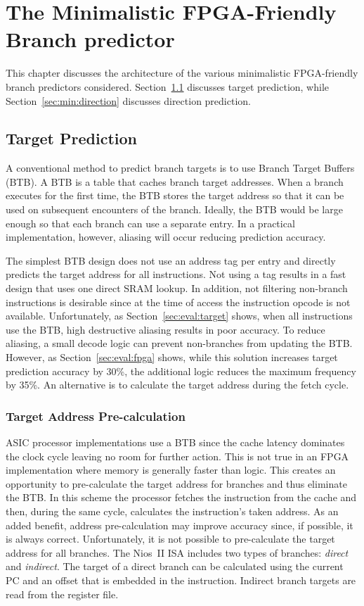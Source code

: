 \chapter{The Minimalistic FPGA-Friendly Branch predictor}
This chapter discusses the architecture of the various minimalistic FPGA-friendly branch predictors considered. Section~\ref{sec:min:target} discusses target prediction, while Section~\ref{sec:min:direction} discusses direction prediction.

\section{Target Prediction}
\label{sec:min:target}
A conventional method to predict branch targets is to use Branch Target Buffers (BTB). A BTB is a table that caches branch target addresses. When a branch executes for the first time, the BTB stores the target address so that it can be used on subsequent encounters of the branch. Ideally, the BTB would be large enough so that each branch can use a separate entry. In a practical implementation, however, aliasing will occur reducing prediction accuracy.  

The simplest BTB design does not use an address tag per entry and directly predicts the target address for all instructions. Not using a tag results in a fast design that uses one direct SRAM lookup. In addition, not filtering non-branch instructions is desirable since at the time of access the instruction opcode is not available. Unfortunately, as Section~\ref{sec:eval:target} shows, when all instructions use the BTB, high destructive aliasing results in poor accuracy. To reduce aliasing, a small decode logic can prevent non-branches from updating the BTB. However, as Section~\ref{sec:eval:fpga} shows, while this solution increases target prediction accuracy by 30\%, the additional logic reduces the maximum frequency by 35\%. An alternative is to calculate the target address during the fetch cycle.

\subsection{Target Address Pre-calculation}
\label{sec:min:target:addrprecalc}

ASIC processor implementations use a BTB since the cache latency dominates the clock cycle leaving no room for further action. This is not true in an FPGA implementation where memory is generally faster than logic. This creates an opportunity to pre-calculate the target address for branches and thus eliminate the BTB. In this scheme the processor fetches the instruction from the cache and then, during the same cycle, calculates the instruction's taken address. As an added benefit, address pre-calculation may improve accuracy since, if possible, it is always correct. Unfortunately, it is not possible to pre-calculate the target address for all branches. The Nios~II ISA includes two types of branches: \textit{direct} and \textit{indirect}. The target of a direct branch can be calculated using the current PC and an offset that is embedded in the instruction. Indirect branch targets are read from the register file.  

